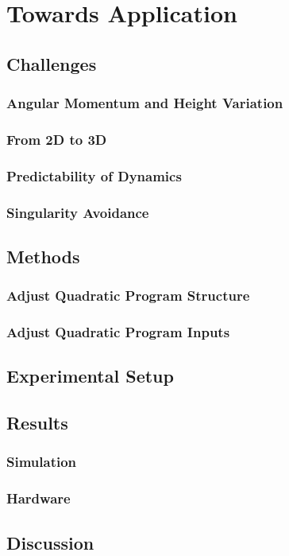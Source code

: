 %
\chapter{Towards Application}

\section{Challenges}
\subsection{Angular Momentum and Height Variation}
\subsection{From 2D to 3D}
\subsection{Predictability of Dynamics}
\subsection{Singularity Avoidance}

\section{Methods}
\subsection{Adjust Quadratic Program Structure}
\subsection{Adjust Quadratic Program Inputs}

\section{Experimental Setup}


\section{Results}
\subsection{Simulation}
\subsection{Hardware}

\section{Discussion}
